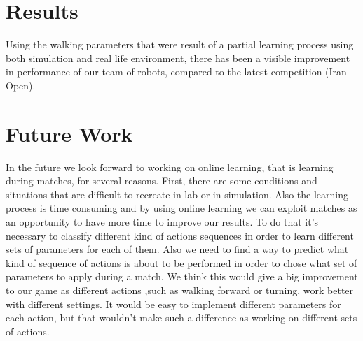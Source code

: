 \documentclass[a4paper, twocolumn]{article}
\begin{document}
\section{Results}
Using the walking parameters that were result of a partial learning process using both simulation and real life environment, there has been a visible improvement in performance of our team of robots, compared to the latest competition (Iran Open). 
 



\section{Future Work}
 
In the future we look forward to working on online learning, that is learning during matches, for several reasons. First, there are some conditions and situations that are difficult to recreate in lab or in simulation. Also the learning process is time consuming and by using online learning we can exploit matches as an opportunity to have more time to improve our results. To do that it's necessary to classify different kind of actions sequences in order to learn different sets of parameters for each of them. Also we need to find a way to predict what kind of sequence of actions is about to be performed in order to chose what set of parameters to apply during a match. We think this would give a big improvement to our game as different actions ,such as walking forward or turning, work better with different settings. It would be easy to implement different parameters for each action, but that wouldn't make such a difference as working on different sets of actions. 



\end{document}
